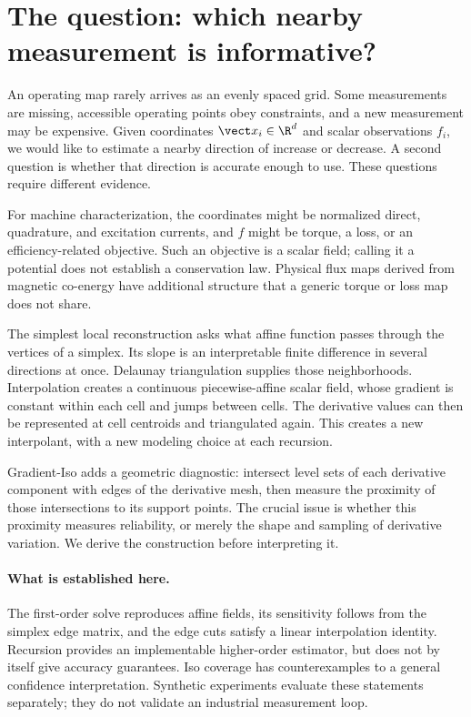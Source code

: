 \section{The question: which nearby measurement is informative?}
An operating map rarely arrives as an evenly spaced grid. Some measurements
are missing, accessible operating points obey constraints, and a new
measurement may be expensive. Given coordinates $\vect x_i\in\R^d$ and scalar
observations $f_i$, we would like to estimate a nearby direction of increase
or decrease. A second question is whether that direction is accurate enough
to use. These questions require different evidence.

For machine characterization, the coordinates might be normalized direct,
quadrature, and excitation currents, and $f$ might be torque, a loss, or an
efficiency-related objective. Such an objective is a scalar field; calling it
a potential does not establish a conservation law. Physical flux maps
derived from magnetic co-energy have additional structure that a generic
torque or loss map does not share.

The simplest local reconstruction asks what affine function passes through
the vertices of a simplex. Its slope is an interpretable finite difference
in several directions at once. Delaunay triangulation supplies those
neighborhoods. Interpolation creates a continuous piecewise-affine scalar
field, whose gradient is constant within each cell and jumps between cells.
The derivative values can then be represented at cell centroids and
triangulated again. This creates a new interpolant, with a new modeling
choice at each recursion.

Gradient-Iso adds a geometric diagnostic: intersect level sets of each
derivative component with edges of the derivative mesh, then measure the
proximity of those intersections to its support points. The crucial issue is
whether this proximity measures reliability, or merely the shape and sampling
of derivative variation. We derive the construction before interpreting it.

\paragraph{What is established here.}
The first-order solve reproduces affine fields, its sensitivity follows from
the simplex edge matrix, and the edge cuts satisfy a linear interpolation
identity. Recursion provides an implementable higher-order estimator, but
does not by itself give accuracy guarantees. Iso coverage has counterexamples
to a general confidence interpretation. Synthetic experiments evaluate these
statements separately; they do not validate an industrial measurement loop.

